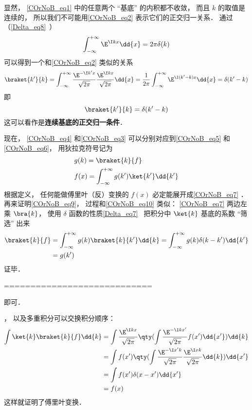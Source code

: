 显然， \autoref{COrNoB_eq1} 中的任意两个 “基底” 的内积都不收敛， 而且 $k$ 的取值是连续的， 所以我们不可能用\autoref{COrNoB_eq2} 表示它们的正交归一关系． 通过（\autoref{Delta_eq8}~）
\begin{equation}
\int_{-\infty}^{+\infty} \E^{\I kx}\dd{x} = 2\pi \delta(k)
\end{equation}
可以得到一个和\autoref{COrNoB_eq2} 类似的关系
\begin{equation}
\braket{k'}{k} = \int_{-\infty}^{+\infty} \frac{\E^{-\I k'x}}{\sqrt{2\pi}} \frac{\E^{\I kx}}{\sqrt{2\pi}}\dd{x}
= \frac{1}{2\pi}\int_{-\infty}^{+\infty} \E^{\I (k'-k)x}\dd{x}
= \delta(k' - k)
\end{equation}
即
\begin{equation}\label{COrNoB_eq8}
\braket{k'}{k} = \delta(k' - k)
\end{equation}
这可以看作是\textbf{连续基底的正交归一条件}．

现在， \autoref{COrNoB_eq4}  和\autoref{COrNoB_eq3} 可以分别对应到\autoref{COrNoB_eq5} 和 \autoref{COrNoB_eq6}， 用狄拉克符号记为
\begin{align}\label{COrNoB_eq9}
&g(k) = \braket{k}{f}\\
\label{COrNoB_eq7}&f(x) = \int_{-\infty}^{+\infty} g(k') \ket{k'} \dd{k'}
\end{align}
根据定义， 任何能做傅里叶（反）变换的 $f(x)$ 必定能展开成\autoref{COrNoB_eq7} ． 再来证明\autoref{COrNoB_eq9}， 过程和\autoref{COrNoB_eq10} 类似： \autoref{COrNoB_eq7} 两边左乘 $\bra{k}$， 使用 $\delta$ 函数的性质\autoref{Delta_eq7}~ 把积分中 $\ket{k}$ 基底的系数 “筛选” 出来
\begin{equation}
\begin{aligned}
\braket{k}{f} &= \int_{-\infty}^{+\infty} g(k) \braket{k}{k'} \dd{k} = \int_{-\infty}^{+\infty} g(k) \delta(k-k') \dd{k'}\\
&= g(k')
\end{aligned}
\end{equation}
证毕．

============================

 即可．

， 以及多重积分可以交换积分顺序：
\begin{equation}
\begin{aligned}
\int \ket{k}\braket{k}{f} \dd{k} &= \int \frac{\E^{\I kx}}{\sqrt{2\pi }} \qty(\int \frac{\E^{-\I k x'}}{\sqrt{2\pi }} f(x') \dd{x'}) \dd{k}\\
&= \int f(x') \qty(\int \frac{\E^{-\I x' k}}{\sqrt{2\pi }}\frac{\E^{\I x k}}{\sqrt{2\pi }}\dd{k}) \dd{x'}\\
&= \int f(x') \delta (x - x') \dd{x'}\\
&= f(x)
\end{aligned}
\end{equation}
这样就证明了傅里叶变换．
